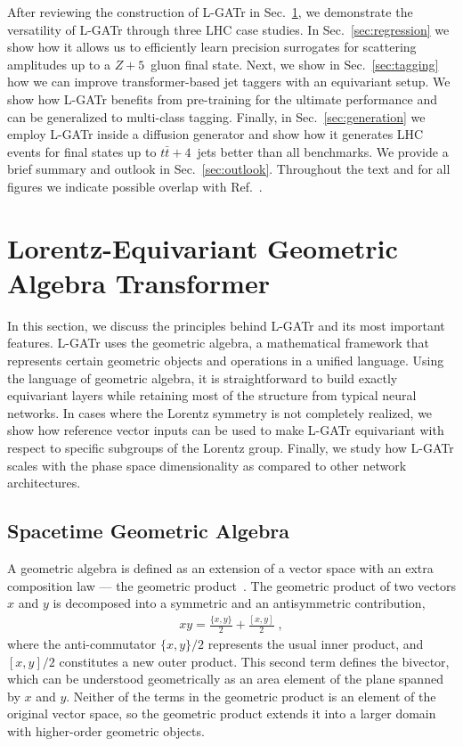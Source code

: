 \documentclass[submission, Phys]{SciPost}
\begin{document}
After reviewing the construction of L-GATr in Sec.~\ref{sec:lgatr}, we demonstrate the versatility of L-GATr through three LHC case studies. In Sec.~\ref{sec:regression} we show how it allows us to efficiently learn precision surrogates for scattering amplitudes up to a $Z+5$~gluon final state. Next, we show in Sec.~\ref{sec:tagging} how we can improve transformer-based jet taggers with an equivariant setup. We show how L-GATr benefits from pre-training for the ultimate performance and can be generalized to multi-class tagging. Finally, in Sec.~\ref{sec:generation} we employ L-GATr inside a diffusion generator and show how it generates LHC events for final states up to $t\bar{t}+4$~jets better than all benchmarks. 
%
We provide a brief summary and outlook in Sec.~\ref{sec:outlook}.
%
Throughout the text and for all figures we indicate possible overlap with Ref.~\cite{Spinner:2024hjm}.

\section{Lorentz-Equivariant Geometric Algebra Transformer}
\label{sec:lgatr}

In this section, we discuss the principles behind L-GATr and its most important features. L-GATr uses the geometric algebra, a mathematical framework that represents certain geometric objects and operations in a unified language. Using the language of geometric algebra, it is straightforward to build exactly equivariant layers while retaining most of the structure from typical neural networks. In cases where the Lorentz symmetry is not completely realized, we show how reference vector inputs can be used to make L-GATr equivariant with respect to specific subgroups of the Lorentz group. Finally, we study how L-GATr scales with the phase space dimensionality as compared to other network architectures.

\subsection{Spacetime Geometric Algebra}
\label{sec:algebra}

A geometric algebra is defined as an extension of a vector space with an extra composition law --- the geometric product~\cite{hestenes1966space}. The geometric product of two vectors $x$ and $y$ is decomposed into a symmetric and an antisymmetric contribution,
%
\begin{align}
    xy = \frac{\{x,y \}}{2} + \frac{[x,y]}{2}  \; ,
    \label{eq:xy_gen}
\end{align}
%
where the anti-commutator $\{x,y \}/2$ represents the usual inner product, and $[x,y]/2$ constitutes a new outer product. This second term defines the bivector, which can be understood geometrically as an area element of the plane spanned by $x$ and $y$. Neither of the terms in the geometric product is an element of the original vector space, so the geometric product extends it into a larger domain with higher-order geometric objects.
\end{document}
